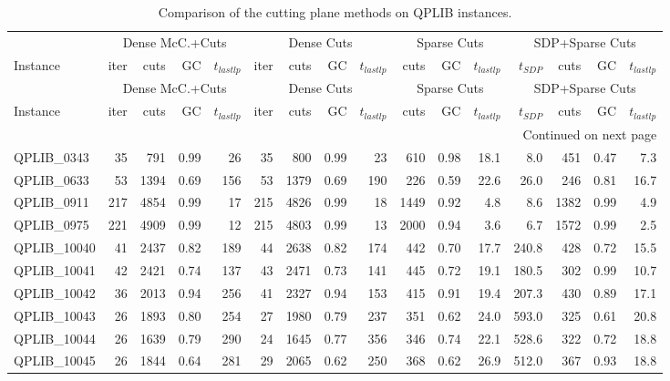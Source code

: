 \documentclass[twoside]{article}
\begin{document}
	\begin{longtable}{l|rrrr|rrrr|rrr|rrrr}
		\caption{Comparison of the cutting plane methods on QPLIB instances.}\label{tab:relaxboundDetail-qplib} \\
		\toprule
		& \multicolumn{4}{c|}{Dense McC.+Cuts} & \multicolumn{4}{c|}{Dense Cuts} & \multicolumn{3}{c|}{Sparse Cuts} & \multicolumn{4}{c}{SDP+Sparse Cuts} \\
		Instance & iter & cuts & GC & $t_{lastlp}$ & iter & cuts & GC & $t_{lastlp}$ & cuts & GC & $t_{lastlp}$ & $t_{SDP}$ & cuts & GC & $t_{lastlp}$ \\
		\midrule
		\endfirsthead
		\toprule
		& \multicolumn{4}{c|}{Dense McC.+Cuts} & \multicolumn{4}{c|}{Dense Cuts} & \multicolumn{3}{c|}{Sparse Cuts} & \multicolumn{4}{c}{SDP+Sparse Cuts} \\
		Instance & iter & cuts & GC & $t_{lastlp}$ & iter & cuts & GC & $t_{lastlp}$ & cuts & GC & $t_{lastlp}$ & $t_{SDP}$ & cuts & GC & $t_{lastlp}$ \\
		\midrule
		\endhead
		\midrule
		\multicolumn{16}{r}{Continued on next page} \\
		\midrule
		\endfoot
		\bottomrule
		\endlastfoot
		QPLIB\_0343 & 35 & 791 & 0.99 & 26 & 35 & 800 & 0.99 & 23 & 610 & 0.98 & 18.1 & 8.0 & 451 & 0.47 & 7.3 \\
		QPLIB\_0633 & 53 & 1394 & 0.69 & 156 & 53 & 1379 & 0.69 & 190 & 226 & 0.59 & 22.6 & 26.0 & 246 & 0.81 & 16.7 \\
		QPLIB\_0911 & 217 & 4854 & 0.99 & 17 & 215 & 4826 & 0.99 & 18 & 1449 & 0.92 & 4.8 & 8.6 & 1382 & 0.99 & 4.9 \\
		QPLIB\_0975 & 221 & 4909 & 0.99 & 12 & 215 & 4803 & 0.99 & 13 & 2000 & 0.94 & 3.6 & 6.7 & 1572 & 0.99 & 2.5 \\
		QPLIB\_10040 & 41 & 2437 & 0.82 & 189 & 44 & 2638 & 0.82 & 174 & 442 & 0.70 & 17.7 & 240.8 & 428 & 0.72 & 15.5 \\
		QPLIB\_10041 & 42 & 2421 & 0.74 & 137 & 43 & 2471 & 0.73 & 141 & 445 & 0.72 & 19.1 & 180.5 & 302 & 0.99 & 10.7 \\
		QPLIB\_10042 & 36 & 2013 & 0.94 & 256 & 41 & 2327 & 0.94 & 153 & 415 & 0.91 & 19.4 & 207.3 & 430 & 0.89 & 17.1 \\
		QPLIB\_10043 & 26 & 1893 & 0.80 & 254 & 27 & 1980 & 0.79 & 237 & 351 & 0.62 & 24.0 & 593.0 & 325 & 0.61 & 20.8 \\
		QPLIB\_10044 & 26 & 1639 & 0.79 & 290 & 24 & 1645 & 0.77 & 356 & 346 & 0.74 & 22.1 & 528.6 & 322 & 0.72 & 18.8 \\
		QPLIB\_10045 & 26 & 1844 & 0.64 & 281 & 29 & 2065 & 0.62 & 250 & 368 & 0.62 & 26.9 & 512.0 & 367 & 0.93 & 18.8 \\

\end{longtable}
\end{document}
